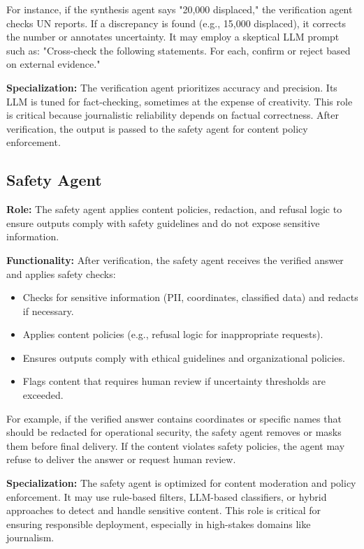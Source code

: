 For instance, if the synthesis agent says "20,000 displaced," the verification agent checks UN reports. If a discrepancy is found (e.g., 15,000 displaced), it corrects the number or annotates uncertainty. It may employ a skeptical LLM prompt such as: "Cross-check the following statements. For each, confirm or reject based on external evidence."  

\textbf{Specialization:} The verification agent prioritizes accuracy and precision. Its LLM is tuned for fact-checking, sometimes at the expense of creativity. This role is critical because journalistic reliability depends on factual correctness. After verification, the output is passed to the safety agent for content policy enforcement.  

\subsection{Safety Agent}
\textbf{Role:} The safety agent applies content policies, redaction, and refusal logic to ensure outputs comply with safety guidelines and do not expose sensitive information.  

\textbf{Functionality:} After verification, the safety agent receives the verified answer and applies safety checks:  
\begin{itemize}
    \item Checks for sensitive information (PII, coordinates, classified data) and redacts if necessary.  
    \item Applies content policies (e.g., refusal logic for inappropriate requests).  
    \item Ensures outputs comply with ethical guidelines and organizational policies.  
    \item Flags content that requires human review if uncertainty thresholds are exceeded.  
\end{itemize}  

For example, if the verified answer contains coordinates or specific names that should be redacted for operational security, the safety agent removes or masks them before final delivery. If the content violates safety policies, the agent may refuse to deliver the answer or request human review.  

\textbf{Specialization:} The safety agent is optimized for content moderation and policy enforcement. It may use rule-based filters, LLM-based classifiers, or hybrid approaches to detect and handle sensitive content. This role is critical for ensuring responsible deployment, especially in high-stakes domains like journalism.

